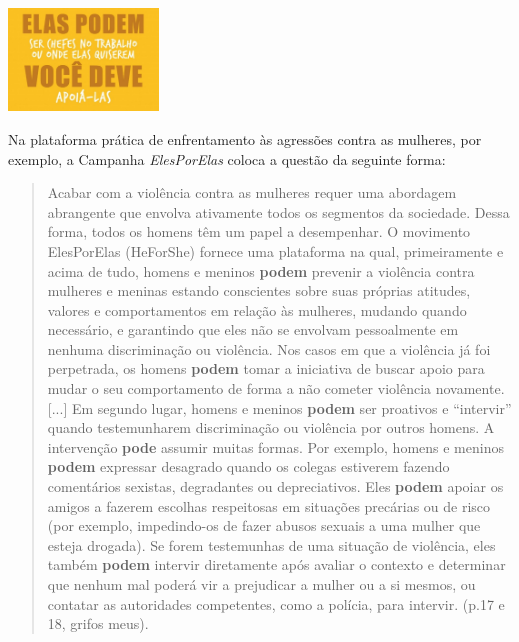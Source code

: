 \begin{center}
\includegraphics[width=4cm]{./imgs/img1.png}
\end{center}

Na plataforma prática de enfrentamento às agressões contra as mulheres,
por exemplo, a Campanha \emph{ElesPorElas} coloca a questão da seguinte
forma:

\begin{quote}
Acabar com a violência contra as mulheres requer uma abordagem
abrangente que envolva ativamente todos os segmentos da sociedade. Dessa
forma, todos os homens têm um papel a desempenhar. O movimento
ElesPorElas (HeForShe) fornece uma plataforma na qual, primeiramente e
acima de tudo, homens e meninos \textbf{podem} prevenir a violência
contra mulheres e meninas estando conscientes sobre suas próprias
atitudes, valores e comportamentos em relação às mulheres, mudando
quando necessário, e garantindo que eles não se envolvam pessoalmente em
nenhuma discriminação ou violência. Nos casos em que a violência já foi
perpetrada, os homens \textbf{podem} tomar a iniciativa de buscar apoio
para mudar o seu comportamento de forma a não cometer violência
novamente. {[}...{]} Em segundo lugar, homens e meninos \textbf{podem}
ser proativos e ``intervir'' quando testemunharem discriminação ou
violência por outros homens. A intervenção \textbf{pode} assumir muitas
formas. Por exemplo, homens e meninos \textbf{podem} expressar desagrado
quando os colegas estiverem fazendo comentários sexistas, degradantes ou
depreciativos. Eles \textbf{podem} apoiar os amigos a fazerem escolhas
respeitosas em situações precárias ou de risco (por exemplo,
impedindo-os de fazer abusos sexuais a uma mulher que esteja drogada).
Se forem testemunhas de uma situação de violência, eles também
\textbf{podem} intervir diretamente após avaliar o contexto e determinar
que nenhum mal poderá vir a prejudicar a mulher ou a si mesmos, ou
contatar as autoridades competentes, como a polícia, para intervir.
(p.17 e 18, grifos meus).
\end{quote}

